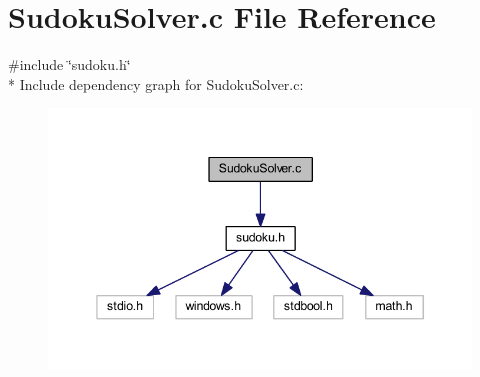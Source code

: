 \section{Sudoku\+Solver.\+c File Reference}
\label{_sudoku_solver_8c}
{\ttfamily \#include \char`\"{}sudoku.\+h\char`\"{}}\\*
Include dependency graph for Sudoku\+Solver.\+c\+:
\nopagebreak
\begin{figure}[H]
\begin{center}
\leavevmode
\includegraphics[width=345pt]{_sudoku_solver_8c__incl}
\end{center}
\end{figure}

